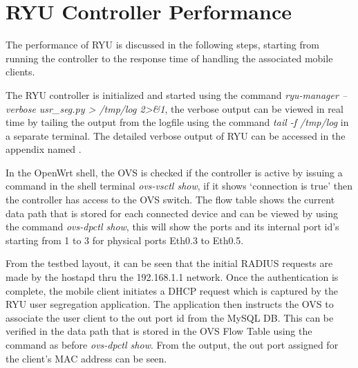 \section{RYU Controller Performance}
The performance of RYU is discussed in the following steps, starting from running the controller to the response time of handling the associated mobile clients.

The RYU controller is initialized and started using the command \textit{ryu-manager --verbose usr\_seg.py > /tmp/log 2>\&1}, the verbose output can be viewed in real time by tailing the output from the logfile using the command \textit{tail -f /tmp/log} in a separate terminal. The detailed verbose output of RYU can be accessed in the appendix named .
 
In the OpenWrt shell, the OVS is checked if the controller is active by issuing a command in the shell terminal \textit{ovs-vsctl show}, if it shows ‘connection is true’ then the controller has access to the OVS switch. The flow table shows the current data path that is stored for each connected device and can be viewed by using the command \textit{ovs-dpctl show}, this will show the ports and its internal port id’s starting from 1 to 3 for physical ports Eth0.3 to Eth0.5.

From the testbed layout, it can be seen that the initial RADIUS requests are made by the hostapd thru the 192.168.1.1 network. Once the authentication is complete, the mobile client initiates a DHCP request which is captured by the RYU user segregation application. The application then instructs the OVS to associate the user client to the out port id from the MySQL DB. This can be verified in the data path that is stored in the OVS Flow Table using the command as before \textit{ovs-dpctl show}. From the output, the out port assigned for the client's MAC address can be seen.

